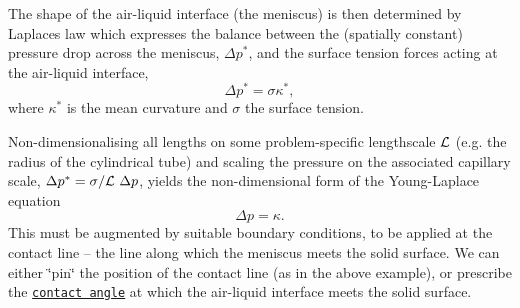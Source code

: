 The shape of the air-\/liquid interface (the meniscus) is then determined by Laplace\textquotesingle{}s law which expresses the balance between the (spatially constant) pressure drop across the meniscus, $ \Delta p^* $, and the surface tension forces acting at the air-\/liquid interface, \[ \Delta p^* = \sigma \kappa^*, \] where $ \kappa^* $ is the mean curvature and $ \sigma $ the surface tension.

Non-\/dimensionalising all lengths on some problem-\/specific lengthscale $ {\cal L} $ (e.\+g. the radius of the cylindrical tube) and scaling the pressure on the associated capillary scale, $ \Delta p^* = \sigma/{\cal L} \ \Delta p $, yields the non-\/dimensional form of the Young-\/\+Laplace equation \[ \Delta p = \kappa. \] This must be augmented by suitable boundary conditions, to be applied at the contact line -- the line along which the meniscus meets the solid surface. We can either \char`\"{}pin\char`\"{} the position of the contact line (as in the above example), or prescribe the \href{http://en.wikipedia.org/wiki/Contact_angle}{\tt contact angle} at which the air-\/liquid interface meets the solid surface.

